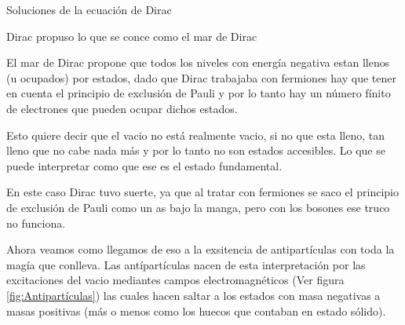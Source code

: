 \begin{marginfigure}[]
  \caption[Mar de Dirac]{Soluciones de la ecuación de Dirac}
  \label{fig:MD}
\end{marginfigure}

Dirac propuso lo que se conce como el mar de Dirac
\begin{definition}
  El mar de Dirac propone que todos los niveles con energía negativa estan llenos (u ocupados) por estados, dado que Dirac trabajaba con fermiones hay que tener en cuenta el principio de exclusión de Pauli y por lo tanto hay un número fínito de electrones que pueden ocupar dichos estados.

  Esto quiere decir que el vacio no está realmente vacio, si no que esta lleno, tan lleno que no cabe nada más y por lo tanto no son estados accesibles. Lo que se puede interpretar como que ese es el estado fundamental. 
\end{definition}

En este caso Dirac tuvo suerte, ya que al tratar con fermiones se saco el principio de exclusión de Pauli como un as bajo la manga, pero con los bosones ese truco no funciona. 

Ahora veamos como llegamos de eso a la exsitencia de antipartículas con toda la magía que conlleva. Las antípartículas nacen de esta interpretación por las excitaciones del vacio mediantes campos electromagnéticos (Ver figura \ref{fig:Antipartículas}) las cuales hacen saltar a los estados con masa negativas a masas positivas (más o menos como los huecos que contaban en estado sólido). 

